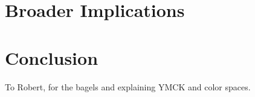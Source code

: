 \documentclass[sigconf,authordraft]{acmart}
\begin{document}
\section{Broader Implications}


\section{Conclusion}


\begin{acks}
To Robert, for the bagels and explaining YMCK and color spaces.
\end{acks}



\end{document}
